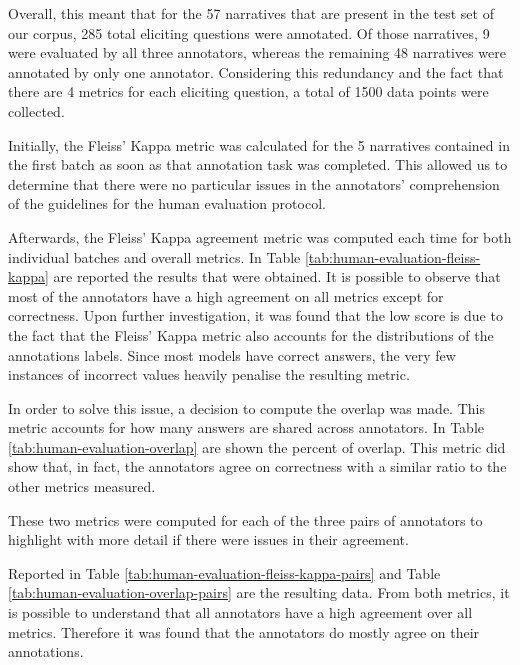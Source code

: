 Overall, this meant that for the 57 narratives that are present in the test set of our corpus, 285 total eliciting questions were annotated. Of those narratives, 9 were evaluated by all three annotators, whereas the remaining 48 narratives were annotated by only one annotator. Considering this redundancy and the fact that there are 4 metrics for each eliciting question, a total of 1500 data points were collected.


Initially, the Fleiss' Kappa \cite{fleiss} metric was calculated for the 5 narratives contained in the first batch as soon as that annotation task was completed. This allowed us to determine that there were no particular issues in the annotators' comprehension of the guidelines for the human evaluation protocol.


Afterwards, the Fleiss' Kappa agreement metric was computed each time for both individual batches and overall metrics. In Table \ref{tab:human-evaluation-fleiss-kappa} are reported the results that were obtained. It is possible to observe that most of the annotators have a high agreement on all metrics except for correctness. Upon further investigation, it was found that the low score is due to the fact that the Fleiss' Kappa metric also accounts for the distributions of the annotations labels. Since most models have correct answers, the very few instances of incorrect values heavily penalise the resulting metric.

In order to solve this issue, a decision to compute the overlap was made. This metric accounts for how many answers are shared across annotators. In Table \ref{tab:human-evaluation-overlap} are shown the percent of overlap. This metric did show that, in fact, the annotators agree on correctness with a similar ratio to the other metrics measured. 




These two metrics were computed for each of the three pairs of annotators to highlight with more detail if there were issues in their agreement. 


Reported in Table \ref{tab:human-evaluation-fleiss-kappa-pairs} and Table \ref{tab:human-evaluation-overlap-pairs} are the resulting data. From both metrics, it is possible to understand that all annotators have a high agreement over all metrics.
Therefore it was found that the annotators do mostly agree on their annotations.

